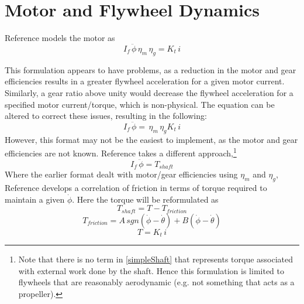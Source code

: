 \documentclass[12pt,letterpaper]{article}
\begin{document}
\section{Motor and Flywheel Dynamics}

Reference \cite{reactionWheel} models the motor as 
%
\begin{equation}
    I_{f} \, \ddot{\phi} \, \eta_{m} \, \eta_{g}  = K_{t} \, i
\end{equation}
%



This formulation appears to have problems, as a reduction in the motor and gear efficiencies results in a 
greater flywheel acceleration for a given motor current.  Similarly, a gear ratio above unity would 
decrease the flywheel acceleration for a specified motor current/torque, which is non-physical.  The equation can be altered
to correct these issues, resulting in the following:
%
\begin{equation}
	I_{f} \, \ddot{\phi} = \, \eta_{m} \, \eta_{g} K_{t} \, i
\end{equation}
%
However, this format may not be the easiest to implement, as the motor and gear efficiencies are not known.  Reference \cite{monograph}
takes a different approach,\footnote{Note that there is no term in \eqref{simpleShaft} that represents torque associated
with external work done by the shaft.  Hence this formulation is limited to flywheels that are reasonably aerodynamic (e.g. not something that
acts as a propeller).}
%
\begin{equation}
    I_{f} \, \ddot{\phi} = T_{shaft}\label{simpleShaft}
\end{equation}
%
Where the earlier format dealt with motor/gear efficiencies using $\eta_{m}$ and $\eta_{g}$, Reference \cite{monograph} develops a correlation of friction in terms of torque required to maintain a given $\dot{\phi}$.  Here the torque will be
reformulated as 
%
\begin{equation}
    T_{shaft} = T - T_{friction}
\end{equation}
%
\begin{equation}
    T_{friction} = A \, sgn(\dot{\phi} - \dot{\theta} ) + B (\dot{\phi} - \dot{\theta})
\end{equation}
%
\begin{equation}
    T = K_{t} \, i
\end{equation}
%
\end{document}

